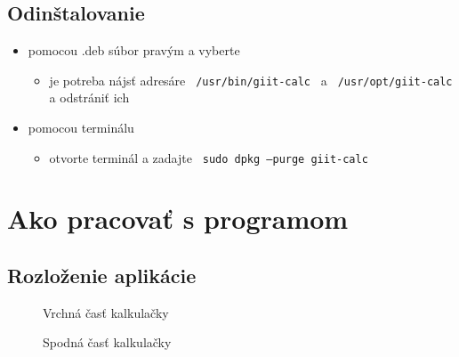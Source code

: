 \documentclass[a4paper, 11pt]{article}
\begin{document}
    \subsection{Odinštalovanie}
    \begin{itemize}
        \item pomocou .deb súbor pravým a vyberte
        \begin{itemize}
            \item je potreba nájsť adresáre \texttt{ /usr/bin/giit-calc } a \texttt{ /usr/opt/giit-calc }a odstrániť ich
        \end{itemize}
        \item pomocou terminálu
        \begin{itemize}
            \item otvorte terminál a zadajte \texttt{ sudo dpkg --purge giit-calc }
        \end{itemize}
    \end{itemize}
    \newpage
    \section{Ako pracovať s programom}
    \subsection{Rozloženie aplikácie}
    \begin{figure}[!h]
        \centering
        \caption{Vrchná časť kalkulačky}
        \label{fig:obrazok1}
    \end{figure}
    
    \begin{figure}[!h]
        \centering
        \caption{Spodná časť kalkulačky}
        \label{fig:obrazok2}
    \end{figure}
    
\end{document}
